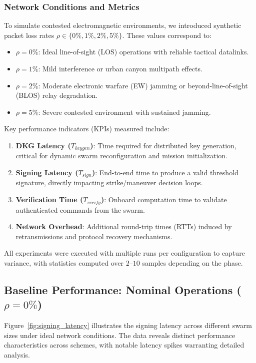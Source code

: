 \subsubsection{Network Conditions and Metrics}
To simulate contested electromagnetic environments, we introduced synthetic packet loss rates $\rho \in \{0\%, 1\%, 2\%, 5\%\}$. These values correspond to:
\begin{itemize}
    \item $\rho = 0\%$: Ideal line-of-sight (LOS) operations with reliable tactical datalinks.
    \item $\rho = 1\%$: Mild interference or urban canyon multipath effects.
    \item $\rho = 2\%$: Moderate electronic warfare (EW) jamming or beyond-line-of-sight (BLOS) relay degradation.
    \item $\rho = 5\%$: Severe contested environment with sustained jamming.
\end{itemize}

Key performance indicators (KPIs) measured include:
\begin{enumerate}
    \item \textbf{DKG Latency ($T_{keygen}$)}: Time required for distributed key generation, critical for dynamic swarm reconfiguration and mission initialization.
    \item \textbf{Signing Latency ($T_{sign}$)}: End-to-end time to produce a valid threshold signature, directly impacting strike/maneuver decision loops.
    \item \textbf{Verification Time ($T_{verify}$)}: Onboard computation time to validate authenticated commands from the swarm.
    \item \textbf{Network Overhead}: Additional round-trip times (RTTs) induced by retransmissions and protocol recovery mechanisms.
\end{enumerate}

All experiments were executed with multiple runs per configuration to capture variance, with statistics computed over $2$--$10$ samples depending on the phase.

\subsection{Baseline Performance: Nominal Operations ($\rho = 0\%$)}
\label{subsec:baseline_performance}

Figure~\ref{fig:signing_latency} illustrates the signing latency across different swarm sizes under ideal network conditions. The data reveals distinct performance characteristics across schemes, with notable latency spikes warranting detailed analysis.

